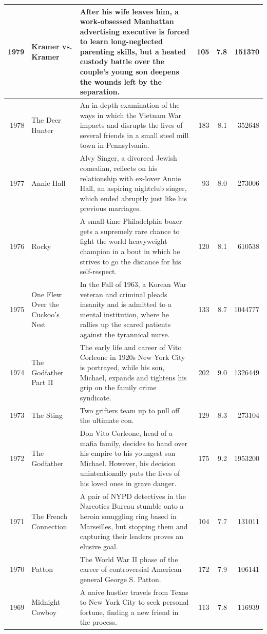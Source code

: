 \documentclass[
]{book}
\begin{document}
\begin{tabular}{r|l|l|r|r|r}
\hline
1979 & Kramer vs. Kramer & After his wife leaves him, a work-obsessed Manhattan advertising executive is forced to learn long-neglected parenting skills, but a heated custody battle over the couple's young son deepens the wounds left by the separation. & 105 & 7.8 & 151370\\
\hline
1978 & The Deer Hunter & An in-depth examination of the ways in which the Vietnam War impacts and disrupts the lives of several friends in a small steel mill town in Pennsylvania. & 183 & 8.1 & 352648\\
\hline
1977 & Annie Hall & Alvy Singer, a divorced Jewish comedian, reflects on his relationship with ex-lover Annie Hall, an aspiring nightclub singer, which ended abruptly just like his previous marriages. & 93 & 8.0 & 273006\\
\hline
1976 & Rocky & A small-time Philadelphia boxer gets a supremely rare chance to fight the world heavyweight champion in a bout in which he strives to go the distance for his self-respect. & 120 & 8.1 & 610538\\
\hline
1975 & One Flew Over the Cuckoo's Nest & In the Fall of 1963, a Korean War veteran and criminal pleads insanity and is admitted to a mental institution, where he rallies up the scared patients against the tyrannical nurse. & 133 & 8.7 & 1044777\\
\hline
1974 & The Godfather Part II & The early life and career of Vito Corleone in 1920s New York City is portrayed, while his son, Michael, expands and tightens his grip on the family crime syndicate. & 202 & 9.0 & 1326449\\
\hline
1973 & The Sting & Two grifters team up to pull off the ultimate con. & 129 & 8.3 & 273104\\
\hline
1972 & The Godfather & Don Vito Corleone, head of a mafia family, decides to hand over his empire to his youngest son Michael. However, his decision unintentionally puts the lives of his loved ones in grave danger. & 175 & 9.2 & 1953200\\
\hline
1971 & The French Connection & A pair of NYPD detectives in the Narcotics Bureau stumble onto a heroin smuggling ring based in Marseilles, but stopping them and capturing their leaders proves an elusive goal. & 104 & 7.7 & 131011\\
\hline
1970 & Patton & The World War II phase of the career of controversial American general George S. Patton. & 172 & 7.9 & 106141\\
\hline
1969 & Midnight Cowboy & A naive hustler travels from Texas to New York City to seek personal fortune, finding a new friend in the process. & 113 & 7.8 & 116939\\

\end{tabular}
\end{document}
